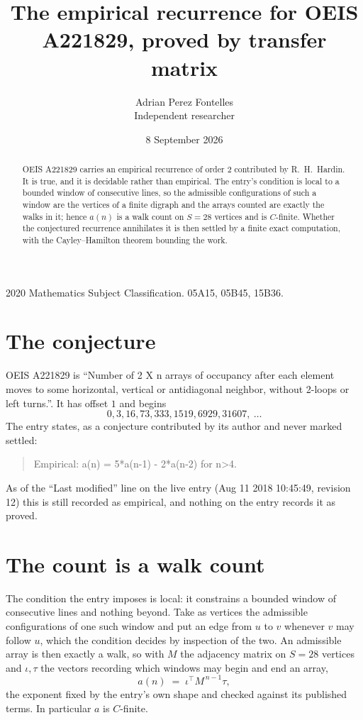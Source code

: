 \documentclass[11pt,a4paper]{article}
\title{The empirical recurrence for OEIS A221829, proved by transfer matrix}
\author{Adrian Perez Fontelles\\ \small Independent researcher}
\date{8 September 2026}
\theoremstyle{plain}
\theoremstyle{definition}
\begin{document}
\maketitle

\begin{abstract}
OEIS A221829 carries an empirical recurrence of order $2$ contributed by R.~H.~Hardin. It is
true, and it is decidable rather than empirical. The entry's condition is local to a bounded window of consecutive lines, so
the admissible configurations of such a window are the vertices of a finite digraph and the
arrays counted are exactly the walks in it; hence $a(n)$ is a walk count on $S=28$ vertices
and is $C$-finite. Whether the conjectured recurrence annihilates it is then settled by a
finite exact computation, with the Cayley--Hamilton theorem bounding the work.
\end{abstract}

\noindent\small 2020 Mathematics Subject Classification. 05A15, 05B45, 15B36.\normalsize

\section{The conjecture}

OEIS A221829 is ``Number of 2 X n arrays of occupancy after each element moves to some horizontal, vertical or antidiagonal neighbor, without 2-loops or left turns.''. It has offset $1$ and begins
\[
0, 3, 16, 73, 333, 1519, 6929, 31607,\ \dots
\]
The entry states, as a conjecture contributed by its author and never marked settled:
\begin{quote}
Empirical: a(n) = 5*a(n-1) - 2*a(n-2) for n>4.
\end{quote}
As of the ``Last modified'' line on the live entry (Aug 11 2018 10:45:49, revision 12) this is still
recorded as empirical, and nothing on the entry records it as proved.

\section{The count is a walk count}

The condition the entry imposes is local: it constrains a bounded window of consecutive lines and nothing beyond. Take as
vertices the admissible configurations of one such window and put an edge from $u$ to $v$
whenever $v$ may follow $u$, which the condition decides by inspection of the two. An
admissible array is then exactly a walk, so with $M$ the adjacency matrix on $S=28$ vertices
and $\iota,\tau$ the vectors recording which windows may begin and end an array,
\[
a(n)\;=\;\iota^{\!\top}M^{\,n-1}\tau ,
\]
the exponent fixed by the entry's own shape and checked against its published terms. In
particular $a$ is $C$-finite.
\end{document}
